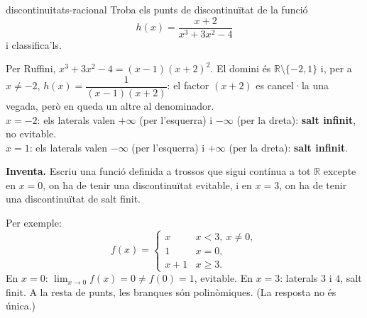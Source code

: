 \begin{apartats}
\begin{tria}{discontinuitats-racional}
Troba els punts de discontinuïtat de la funció
\[
h(x)=\frac{x+2}{x^3+3x^2-4}
\]
i classifica'ls.

\begin{solucio}
Per Ruffini, $x^3+3x^2-4=(x-1)(x+2)^2$. El domini és $\mathbb{R}\setminus\{-2,1\}$ i, per a
$x\neq-2$, $h(x)=\dfrac{1}{(x-1)(x+2)}$: el factor $(x+2)$ es cancel·la una vegada, però en
queda un altre al denominador.\\
$x=-2$: els laterals valen $+\infty$ (per l'esquerra) i $-\infty$ (per la dreta):
\textbf{salt infinit}, no evitable.\\
$x=1$: els laterals valen $-\infty$ (per l'esquerra) i $+\infty$ (per la dreta):
\textbf{salt infinit}.
\end{solucio}
\end{tria}

\begin{nomesllarg}
\textbf{Inventa.} Escriu una funció definida a trossos que sigui contínua a tot
$\mathbb{R}$ excepte en $x=0$, on ha de tenir una discontinuïtat evitable, i en $x=3$, on
ha de tenir una discontinuïtat de salt finit.

\begin{solucio}
Per exemple:
\[
f(x)=\begin{cases} x & \si{x<3,\ x\ne0},\\ 1 & \si{x=0},\\ x+1 & \si{x\ge3}.\end{cases}
\]
En $x=0$: $\lim_{x\to0}f(x)=0\ne f(0)=1$, evitable. En $x=3$: laterals $3$ i $4$, salt
finit. A la resta de punts, les branques són polinòmiques. (La resposta no és única.)
\end{solucio}
\end{nomesllarg}

\end{apartats}
